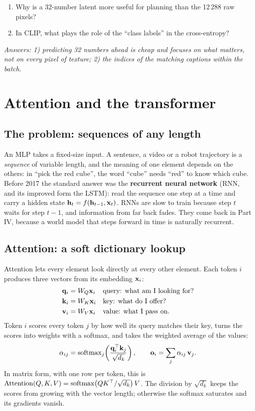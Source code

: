 \begin{quizbox}
\begin{enumerate}[leftmargin=*]
\item Why is a 32-number latent more useful for planning than the 12\,288 raw pixels?
\item In CLIP, what plays the role of the ``class labels'' in the cross-entropy?
\end{enumerate}
\emph{Answers: 1) predicting 32 numbers ahead is cheap and focuses on what matters, not on every pixel of texture; 2) the indices of the matching captions within the batch.}
\end{quizbox}

\section{Attention and the transformer}
\label{sec:transformer}

\subsection{The problem: sequences of any length}
An MLP takes a fixed-size input. A sentence, a video or a robot trajectory is a \emph{sequence} of variable length, and the meaning of one element depends on the others: in ``pick the red cube'', the word ``cube'' needs ``red'' to know which cube. Before 2017 the standard answer was the \textbf{recurrent neural network} (RNN, and its improved form the LSTM): read the sequence one step at a time and carry a hidden state $\mathbf{h}_t=f(\mathbf{h}_{t-1},\mathbf{x}_t)$. RNNs are slow to train because step $t$ waits for step $t-1$, and information from far back fades. They come back in Part IV, because a world model that steps forward in time is naturally recurrent.

\subsection{Attention: a soft dictionary lookup}
Attention lets every element look directly at every other element. Each token $i$ produces three vectors from its embedding $\mathbf{x}_i$:
\begin{align*}
\mathbf{q}_i&=W_Q\mathbf{x}_i && \text{query: what am I looking for?}\\
\mathbf{k}_i&=W_K\mathbf{x}_i && \text{key: what do I offer?}\\
\mathbf{v}_i&=W_V\mathbf{x}_i && \text{value: what I pass on.}
\end{align*}
Token $i$ scores every token $j$ by how well its query matches their key, turns the scores into weights with a softmax, and takes the weighted average of the values:
\begin{equation}
\alpha_{ij}=\operatorname{softmax}_j\!\left(\frac{\mathbf{q}_i^\top\mathbf{k}_j}{\sqrt{d_k}}\right),\qquad
\mathbf{o}_i=\sum_j\alpha_{ij}\,\mathbf{v}_j .
\label{eq:attn}
\end{equation}
In matrix form, with one row per token, this is $\mathrm{Attention}(Q,K,V)=\operatorname{softmax}\!\big(QK^\top/\sqrt{d_k}\big)\,V$.
The division by $\sqrt{d_k}$ keeps the scores from growing with the vector length; otherwise the softmax saturates and its gradients vanish.

